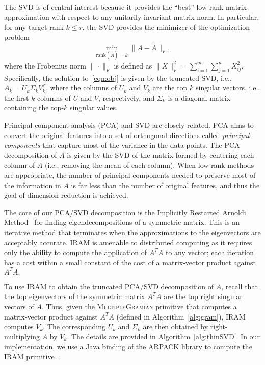 The SVD is of central interest because it provides the ``best'' low-rank matrix
approximation with respect to any unitarily invariant matrix norm.  In
particular, for any target rank $k \leq r$, the SVD provides the minimizer of
the optimization problem
\begin{equation}
 \label{eqn:obj}
  \min_{\text{rank}(\tilde A) = k} \| A - \tilde A \|_F,
\end{equation}
where the Frobenius norm $\| \cdot \|_F$ is defined as $\|X\|_F^2 =
\sum_{i=1}^m \sum_{j=1}^n X_{ij}^2 $. Specifically, the solution
to~\eqref{eqn:obj} is given by the truncated SVD, i.e., $A_k = U_k \Sigma_k
V_k^T$, where the columns of $U_k$ and $V_k$ are the top $k$ singular vectors,
i.e., the first $k$ columns of $U$ and $V$, respectively, and $\Sigma_k$ is a 
diagonal matrix containing the top-$k$ singular values.

Principal component analysis (PCA) and SVD are closely related.  PCA aims to
convert the original features into a set of orthogonal directions called {\it
principal components} that capture most of the variance in the data points.
The PCA decomposition of $A$ is given by the SVD of the matrix formed by
centering each column of $A$ (i.e., removing the mean of each column).  When
low-rank methods are appropriate, the number of principal components needed to
preserve most of the information in $A$ is far less than the number of original
features, and thus the goal of dimension reduction is achieved.

The core of our PCA/SVD decomposition is the Implicitly Restarted Arnoldi
Method~\cite{ArpackUserGuide} for finding eigendecompositions of a symmetric
matrix.  This is an iterative method that terminates when the approximations to
the eigenvectors are acceptably accurate. IRAM is amenable to distributed
computing as it requires only the ability to compute the application of $A^TA$
to any vector; each iteration has a cost within a small constant of the cost 
of a matrix-vector product against $A^TA.$

To use IRAM to obtain the truncated PCA/SVD decomposition of $A$, recall that 
the top eigenvectors of the symmetric matrix $A^TA$ are the top right singular
vectors of $A$. Thus, given the \textsc{MultiplyGramian} primitive that computes a
matrix-vector product against $A^TA$ (defined in Algorithm~\ref{alg:gram}), IRAM
computes $V_k.$ The corresponding $U_k$ and $\Sigma_k$ are then obtained
by right-multiplying $A$ by $V_k$. The details are provided in Algorithm~\ref{alg:thinSVD}. In our implementation, we use a Java binding of the 
ARPACK library to compute the IRAM primitive~\cite{maschho1996portable}.

